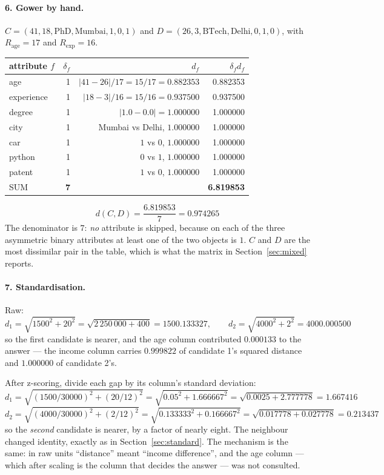 \documentclass[11pt]{article}
\begin{document}
\paragraph{6. Gower by hand.}
$C = (41, 18, \text{PhD}, \text{Mumbai}, 1, 0, 1)$ and
$D = (26, 3, \text{BTech}, \text{Delhi}, 0, 1, 0)$, with $R_{\text{age}} = 17$
and $R_{\text{exp}} = 16$.
\begin{center}
\begin{tabular}{lrrr}
  \toprule
  attribute $f$ & $\delta_f$ & $d_f$ & $\delta_f d_f$ \\ \midrule
  age & 1 & $|41-26|/17 = 15/17 = 0.882353$ & 0.882353 \\
  experience & 1 & $|18-3|/16 = 15/16 = 0.937500$ & 0.937500 \\
  degree & 1 & $|1.0 - 0.0| = 1.000000$ & 1.000000 \\
  city & 1 & Mumbai vs Delhi, $1.000000$ & 1.000000 \\
  car & 1 & $1$ vs $0$, $1.000000$ & 1.000000 \\
  python & 1 & $0$ vs $1$, $1.000000$ & 1.000000 \\
  patent & 1 & $1$ vs $0$, $1.000000$ & 1.000000 \\
  \midrule
  SUM & \textbf{7} & & \textbf{6.819853} \\
  \bottomrule
\end{tabular}
\end{center}
\[
  d(C,D) = \frac{6.819853}{7} = 0.974265
\]
The denominator is $7$: \emph{no} attribute is skipped, because on each of
the three asymmetric binary attributes at least one of the two objects is
$1$. $C$ and $D$ are the most dissimilar pair in the table, which is what the
matrix in Section~\ref{sec:mixed} reports.

\paragraph{7. Standardisation.}
Raw:
\[
  d_1 = \sqrt{1500^2 + 20^2} = \sqrt{2\,250\,000 + 400} = 1500.133327,
  \qquad
  d_2 = \sqrt{4000^2 + 2^2} = 4000.000500
\]
so the first candidate is nearer, and the age column contributed
$0.000133$ to the answer --- the income column carries $0.999822$ of
candidate 1's squared distance and $1.000000$ of candidate 2's.

After z-scoring, divide each gap by its column's standard deviation:
\[
  d_1 = \sqrt{(1500/30000)^2 + (20/12)^2} = \sqrt{0.05^2 + 1.666667^2}
      = \sqrt{0.0025 + 2.777778} = 1.667416
\]
\[
  d_2 = \sqrt{(4000/30000)^2 + (2/12)^2} = \sqrt{0.133333^2 + 0.166667^2}
      = \sqrt{0.017778 + 0.027778} = 0.213437
\]
so the \emph{second} candidate is nearer, by a factor of nearly eight. The
neighbour changed identity, exactly as in Section~\ref{sec:standard}. The
mechanism is the same: in raw units ``distance'' meant ``income
difference'', and the age column --- which after scaling is the column that
decides the answer --- was not consulted.
\end{document}
